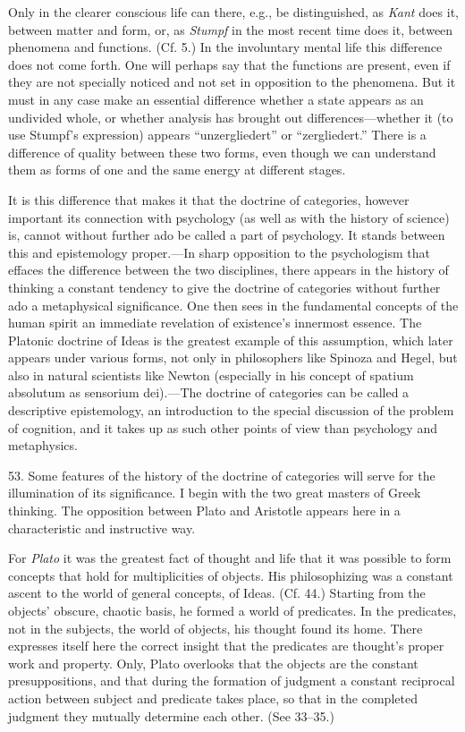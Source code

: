 \documentclass[12pt,a4paper]{book}
\newcommand{\opage}[1]{\marginnote{\footnotesize\textit{[#1]}}}
\begin{document}
Only in the clearer conscious life can there, e.g., be distinguished, as
\emph{Kant} does it, between matter and form, or, as \emph{Stumpf} in the
most recent time does it, between phenomena and functions. (Cf. 5.) In
the involuntary mental life this difference does not come forth. One will
perhaps say that the functions are present, even if they are not specially
noticed and not set in opposition to the phenomena. But it must in any case
make an essential difference whether a state appears as an undivided whole,
or whether analysis has brought out differences---whether it (to use
Stumpf's expression) appears ``unzergliedert'' or ``zergliedert.'' There is
a difference of quality between these two forms, even though we can
understand them as forms of one and the same energy at different stages.

It is this difference that makes it that the doctrine of categories,
however important its connection with psychology (as well as with the
history of science) is, cannot without further ado be called a part of
psychology. It stands between this and epistemology proper.---In sharp
opposition to the psychologism that effaces the difference between the two
disciplines, there appears in the history of thinking a constant tendency
to give the doctrine of categories without further ado a metaphysical
significance. One then sees in the fundamental concepts of the human spirit
an immediate revelation of existence's innermost essence. \opage{140}The Platonic
doctrine of Ideas is the greatest example of this assumption, which later
appears under various forms, not only in philosophers like Spinoza and
Hegel, but also in natural scientists like Newton (especially in his
concept of spatium absolutum as sensorium dei).---The doctrine of
categories can be called a descriptive epistemology, an introduction to the
special discussion of the problem of cognition, and it takes up as such
other points of view than psychology and metaphysics.

53. Some features of the history of the doctrine of categories will serve
for the illumination of its significance. I begin with the two great
masters of Greek thinking. The opposition between Plato and Aristotle
appears here in a characteristic and instructive way.

For \emph{Plato} it was the greatest fact of thought and life that it was
possible to form concepts that hold for multiplicities of objects. His
philosophizing was a constant ascent to the world of general concepts, of
Ideas. (Cf. 44.) Starting from the objects' obscure, chaotic basis, he
formed a world of predicates. In the predicates, not in the subjects, the
world of objects, his thought found its home. There expresses itself here
the correct insight that the predicates are thought's proper work and
property. Only, Plato overlooks that the objects are the constant
presuppositions, and that during the formation of judgment a constant
reciprocal action between subject and predicate takes place, so that in the completed judgment they mutually determine each other. (See 33--35.)
\end{document}
